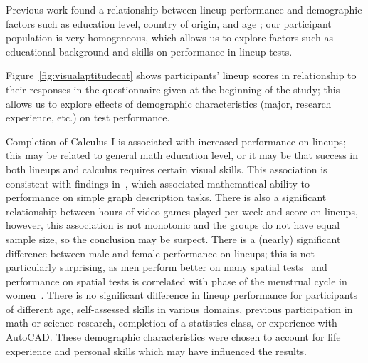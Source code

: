 \documentclass[11pt]{isuthesis}\usepackage[]{graphicx}\usepackage[]{color}
\begin{document}
Previous work found a relationship between lineup performance and demographic factors such as education level, country of origin, and age \citep{humanfactorslineups}; our participant population is very homogeneous, which allows us to explore factors such as educational background and skills on performance in lineup tests. 

Figure~\ref{fig:visualaptitudecat} shows participants' lineup scores in relationship to their responses in the questionnaire given at the beginning of the study; this allows us to explore effects of demographic characteristics (major, research experience, etc.) on test performance. 

Completion of Calculus I is associated with increased performance on lineups; this may be related to general math education level, or it may be that success in both lineups and calculus requires certain visual skills. This association is consistent with findings in~\citep{shah1995conceptual}, which associated  mathematical ability to performance on simple graph description tasks.  There is also a significant relationship between hours of video games played per week and score on lineups, however, this association is not monotonic and the groups do not have equal sample size, so the conclusion may be suspect. There is a (nearly) significant difference between male and female performance on lineups; this is not particularly surprising, as men perform better on many spatial tests~\citep{voyer1995magnitude} and performance on spatial tests is correlated with phase of the menstrual cycle in women~\citep{hausmann2000sex}. There is no significant difference in lineup performance for participants of different age, self-assessed skills in various domains, previous participation in math or science research, completion of a statistics class, or experience with AutoCAD. These demographic characteristics were chosen to account for life experience and personal skills which may have influenced the results. 
\end{document}
